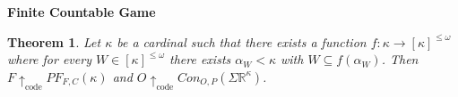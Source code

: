 \documentclass[11pt]{article}
\theoremstyle{plain}
\newtheorem{theorem}{Theorem}
\theoremstyle{definition}
\theoremstyle{remark}
\newcommand{\codewin}{\uparrow_{\text{code}}}
\begin{document}
%
%
%
%
%

\centerline{\bf Finite Countable Game}

\begin{theorem}
Let $\kappa$ be a cardinal such that there exists a function $f:\kappa\to[\kappa]^{\leq \omega}$ where for every $W\in[\kappa]^{\leq\omega}$ there exists $\alpha_W<\kappa$ with $W\subseteq f(\alpha_W)$. Then $F \codewin PF_{F,C}(\kappa)$ and $O \codewin Con_{O,P}(\Sigma\mathbb{R}^\kappa)$.
\end{theorem}
\end{document}
